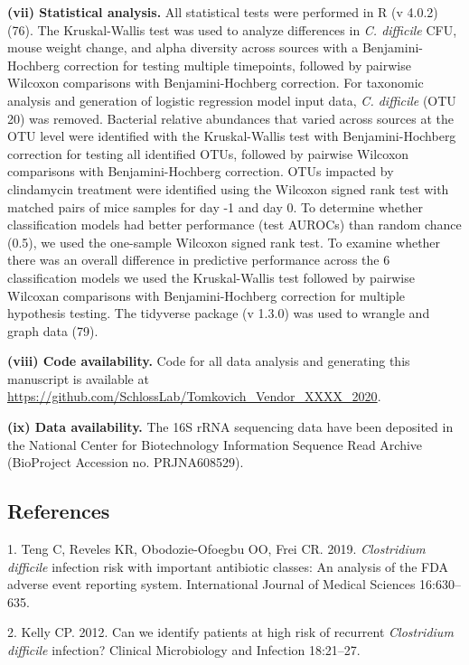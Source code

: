 \documentclass[
  11pt,
]{article}
\begin{document}
\textbf{(vii) Statistical analysis.} All statistical tests were
performed in R (v 4.0.2) (76). The Kruskal-Wallis test was used to
analyze differences in \emph{C. difficile} CFU, mouse weight change, and
alpha diversity across sources with a Benjamini-Hochberg correction for
testing multiple timepoints, followed by pairwise Wilcoxon comparisons
with Benjamini-Hochberg correction. For taxonomic analysis and
generation of logistic regression model input data, \emph{C. difficile}
(OTU 20) was removed. Bacterial relative abundances that varied across
sources at the OTU level were identified with the Kruskal-Wallis test
with Benjamini-Hochberg correction for testing all identified OTUs,
followed by pairwise Wilcoxon comparisons with Benjamini-Hochberg
correction. OTUs impacted by clindamycin treatment were identified using
the Wilcoxon signed rank test with matched pairs of mice samples for day
-1 and day 0. To determine whether classification models had better
performance (test AUROCs) than random chance (0.5), we used the
one-sample Wilcoxon signed rank test. To examine whether there was an
overall difference in predictive performance across the 6 classification
models we used the Kruskal-Wallis test followed by pairwise Wilcoxan
comparisons with Benjamini-Hochberg correction for multiple hypothesis
testing. The tidyverse package (v 1.3.0) was used to wrangle and graph
data (79).

\textbf{(viii) Code availability.} Code for all data analysis and
generating this manuscript is available at
\url{https://github.com/SchlossLab/Tomkovich_Vendor_XXXX_2020}.

\textbf{(ix) Data availability.} The 16S rRNA sequencing data have been
deposited in the National Center for Biotechnology Information Sequence
Read Archive (BioProject Accession no. PRJNA608529).

\newpage

\hypertarget{references}{%
\subsection{References}\label{references}}

\hypertarget{refs}{}
\leavevmode\hypertarget{ref-Teng2019}{}%
1. Teng C, Reveles KR, Obodozie-Ofoegbu OO, Frei CR. 2019.
\emph{Clostridium difficile} infection risk with important antibiotic
classes: An analysis of the FDA adverse event reporting system.
International Journal of Medical Sciences 16:630--635.

\leavevmode\hypertarget{ref-Kelly2012}{}%
2. Kelly CP. 2012. Can we identify patients at high risk of recurrent
\emph{Clostridium difficile} infection? Clinical Microbiology and
Infection 18:21--27.
\end{document}
